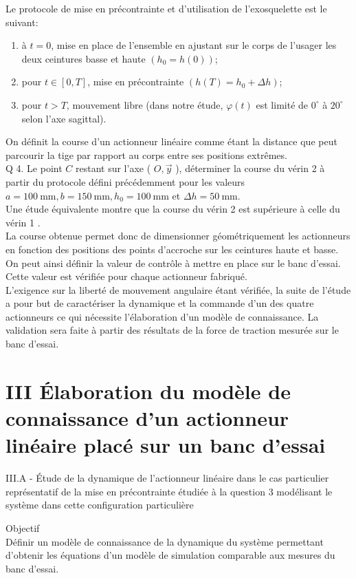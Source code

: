 Le protocole de mise en précontrainte et d'utilisation de l'exosquelette est le suivant:

\begin{enumerate}
  \item à $t=0$, mise en place de l'ensemble en ajustant sur le corps de l'usager les deux ceintures basse et haute $\left(h_{0}=h(0)\right)$;
  \item pour $t \in[0, T]$, mise en précontrainte $\left(h(T)=h_{0}+\Delta h\right)$;
  \item pour $t>T$, mouvement libre (dans notre étude, $\varphi(t)$ est limité de $0^{\circ}$ à $20^{\circ}$ selon l'axe sagittal).
\end{enumerate}

On définit la course d'un actionneur linéaire comme étant la distance que peut parcourir la tige par rapport au corps entre ses positions extrêmes.\\
Q 4. Le point $C$ restant sur l'axe ( $O, \vec{y}$ ), déterminer la course du vérin 2 à partir du protocole défini précédemment pour les valeurs $a=100 \mathrm{~mm}, b=150 \mathrm{~mm}, h_{0}=100 \mathrm{~mm}$ et $\Delta h=50 \mathrm{~mm}$.\\
Une étude équivalente montre que la course du vérin 2 est supérieure à celle du vérin 1 .\\
La course obtenue permet donc de dimensionner géométriquement les actionneurs en fonction des positions des points d'accroche sur les ceintures haute et basse. On peut ainsi définir la valeur de contrôle à mettre en place sur le banc d'essai. Cette valeur est vérifiée pour chaque actionneur fabriqué.\\
L'exigence sur la liberté de mouvement angulaire étant vérifiée, la suite de l'étude a pour but de caractériser la dynamique et la commande d'un des quatre actionneurs ce qui nécessite l'élaboration d'un modèle de connaissance. La validation sera faite à partir des résultats de la force de traction mesurée sur le banc d'essai.

\section{III Élaboration du modèle de connaissance d'un actionneur linéaire placé sur un banc d'essai}
III.A - Étude de la dynamique de l'actionneur linéaire dans le cas particulier représentatif de la mise en précontrainte étudiée à la question 3 modélisant le système dans cette configuration particulière

Objectif\\
Définir un modèle de connaissance de la dynamique du système permettant d'obtenir les équations d'un modèle de simulation comparable aux mesures du banc d'essai.

